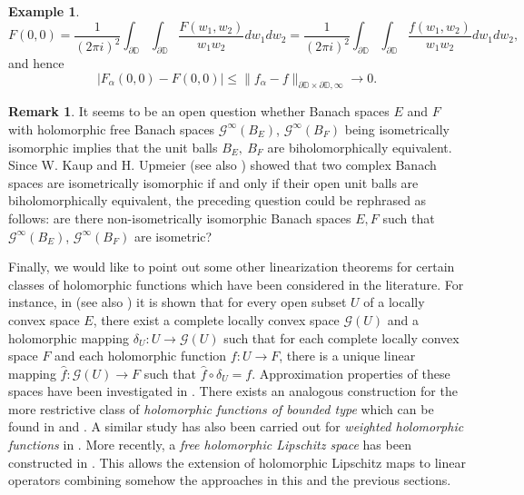 \documentclass[12pt,leqno]{amsart}
\numberwithin{equation}{section} %
\theoremstyle{definition}
\newtheorem{rem}[thm]{Remark}
\newtheorem{example}[thm]{Example}
\numberwithin{equation}{section}
\begin{document}
\begin{example}
$$
F(0,0)=\frac{1}{(2\pi i)^2}\int_{\partial\mathbb{D}}\int_{\partial\mathbb{D}} \frac{F(w_1,w_2)}{w_1w_2}dw_1dw_2=\frac{1}{(2\pi i)^2}\int_{\partial\mathbb{D}}\int_{\partial\mathbb{D}} \frac{f(w_1,w_2)}{w_1w_2}dw_1dw_2,
$$
and hence
$$
    |F_\alpha(0,0)-F(0,0)|  \leq  \|f_\alpha-f\|_{\partial\mathbb{D}\times\partial\mathbb{D},\infty} \to 0.
$$
\end{example}

\begin{rem}
It seems to be an open question whether Banach spaces $E$ and $F$ with holomorphic free Banach spaces $\mathcal{G}^\infty(B_E)$, $\mathcal{G}^\infty(B_F)$ being isometrically isomorphic implies that the unit balls $B_E, \: B_F$ are biholomorphically equivalent. Since W. Kaup and H. Upmeier \cite{KU} (see also \cite{Arazy}) showed that two complex Banach spaces are isometrically isomorphic if and only if their open unit balls are biholomorphically equivalent, the preceding question could be rephrased as follows: are there non-isometrically isomorphic Banach spaces $E,F$ such that $\mathcal{G}^\infty(B_E)$, $\mathcal{G}^\infty(B_F)$ are isometric?
\end{rem}

Finally, we would like to point out some other linearization theorems for certain classes of holomorphic functions which have been considered in the literature. For instance, in \cite{Mazet} (see also \cite{Mujica-Nachbin}) it is shown that for every open subset $U$ of a locally convex space $E$, there exist a complete locally convex space $\mathcal{G}(U)$ and a holomorphic mapping $\delta_U:U\to \mathcal{G}(U)$ such that for each complete locally convex space $F$ and each holomorphic function $f:U\to F$, there is a unique linear mapping $\hat{f}:\mathcal{G}(U)\to F$ such that $\hat{f}\circ \delta_U=f$. Approximation properties of these spaces have been investigated in \cite{Boyd,Caliskan}. There exists an analogous construction for the more restrictive class of \textit{holomorphic functions of bounded type} which can be found in \cite{GGM} and \cite{Mujica92}. A similar study has also been carried out for \textit{weighted holomorphic functions} in \cite{GuBa, GuBa2}. More recently, a \textit{free holomorphic Lipschitz space} has been constructed in \cite{ADGM}. This allows the extension of holomorphic Lipschitz maps to linear operators combining somehow the approaches in this and the previous sections.
\end{document}
